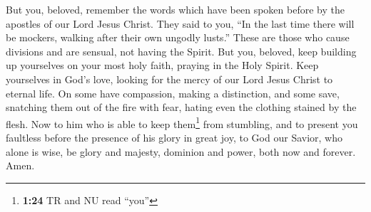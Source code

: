  But you, beloved, remember the words which have been
spoken before by the apostles of our Lord Jesus Christ. 
They said to you, ``In the last time there will be mockers, walking
after their own ungodly lusts.''  These are those who
cause divisions and are sensual, not having the Spirit. 
But you, beloved, keep building up yourselves on your most holy faith,
praying in the Holy Spirit.  Keep yourselves in God's
love, looking for the mercy of our Lord Jesus Christ to eternal life.
 On some have compassion, making a distinction,
 and some save, snatching them out of the fire with fear,
hating even the clothing stained by the flesh.  Now to
him who is able to keep them\footnote{\textbf{1:24} TR and NU read
  ``you''} from stumbling, and to present you faultless before the
presence of his glory in great joy,  to God our Savior,
who alone is wise, be glory and majesty, dominion and power, both now
and forever. Amen.
